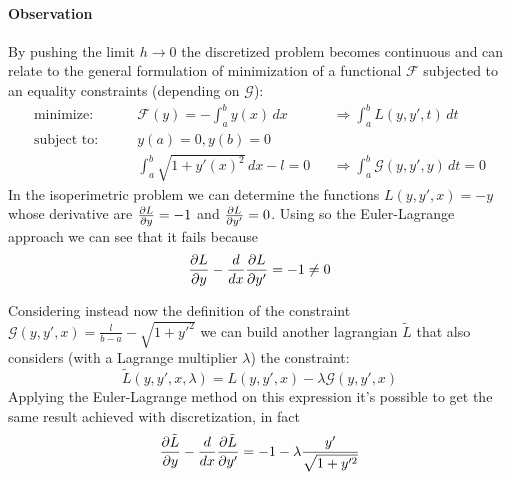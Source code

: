 \paragraph{Observation} By pushing the limit $h\rightarrow 0$ the discretized problem becomes continuous and can relate to the general formulation of minimization of a functional $\mathcal F$ subjected to an equality constraints (depending on $\mathcal G$):
\begin{align*}
	\textrm{minimize:} \qquad & \mathcal F(y) = - \int_a^b y(x)\, dx && \Rightarrow \int_a^b  L (y,y',t)\,dt \\
	\textrm{subject to:} \qquad & y(a) = 0 , y(b) = 0\\ & \int_a^b \sqrt{1+y'(x)^2}\, dx - l = 0 && \Rightarrow \int_a^b \mathcal G(y,y',y)\, dt = 0
\end{align*}
In the isoperimetric problem we can determine the functions $ L (y,y',x) = -y$ whose derivative are $\frac{\partial  L }{\partial y} = -1$ and $\frac{\partial  L }{\partial y'} = 0$. Using so the Euler-Lagrange approach we can see that it fails because
\[ \frac{\partial  L }{\partial y } - \frac{d}{dx} \frac{\partial  L }{\partial y'} = - 1 \neq 0 \]

Considering instead now the definition of the constraint $\mathcal G(y,y',x) = \frac{l}{b-a} - \sqrt{1 + y'^2}$ we can build another lagrangian $\tilde{ L }$ that also considers (with a Lagrange multiplier $\lambda$) the constraint:
\[ \tilde{ L }(y,y',x,\lambda) =  L (y,y',x) - \lambda \mathcal G(y,y',x) \]
Applying the Euler-Lagrange method on this expression it's possible to get the same result achieved with discretization, in fact
\[ \frac{\partial \tilde{ L }}{\partial y} - \frac{d}{dx} \frac{\partial \tilde{ L }}{\partial y'} = - 1 - \lambda \frac{y'}{\sqrt{1 + y'^2}} \]

